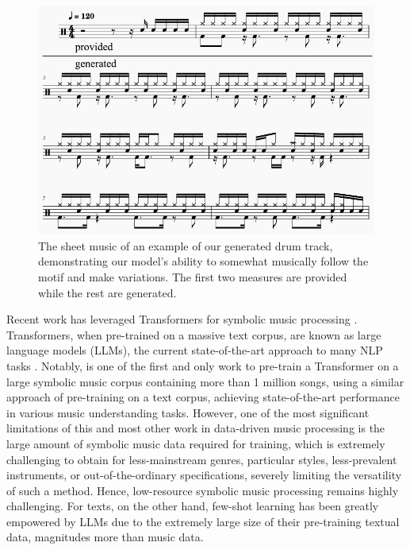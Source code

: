 \documentclass[letterpaper]{article} %
\begin{document}
\begin{figure}[t!]
\centering
\includegraphics[scale=0.37]{images/example.png}
\caption{The sheet music of an example of our generated drum track, demonstrating our model's ability to somewhat musically follow the motif and make variations. The first two measures are provided while the rest are generated.}
\label{fig:example}
\end{figure}

Recent work has leveraged Transformers \cite{NIPS2017_3f5ee243} for symbolic music processing \citep{huang2018music,https://doi.org/10.48550/arxiv.2210.10349}. Transformers, when pre-trained on a massive text corpus, are known as large language models (LLMs), the current state-of-the-art approach to many NLP tasks \cite{devlin-etal-2019-bert,NEURIPS2020_1457c0d6}. Notably, \citet{zeng2021musicbert} is one of the first and only work to pre-train a Transformer on a large symbolic music corpus containing more than 1 million songs, using a similar approach of pre-training on a text corpus, achieving state-of-the-art performance in various music understanding tasks. However, one of the most significant limitations of this and most other work in data-driven music processing is the large amount of symbolic music data required for training, which is extremely challenging to obtain for less-mainstream genres, particular styles, less-prevalent instruments, or out-of-the-ordinary specifications, severely limiting the versatility of such a method. Hence, low-resource symbolic music processing remains highly challenging. For texts, on the other hand, few-shot learning has been greatly empowered by LLMs due to the extremely large size of their pre-training textual data, magnitudes more than music data.
\end{document}
